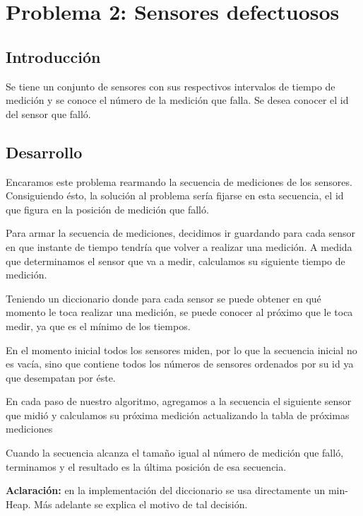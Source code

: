 \section{Problema 2: Sensores defectuosos}

\subsection{Introducci\'on}

\quad Se tiene un conjunto de sensores con sus respectivos intervalos de tiempo de medici\'on y se conoce el n\'umero de la medici\'on que falla. Se desea conocer el id del sensor que fall\'o. 

\subsection{Desarrollo}

\quad Encaramos este problema rearmando la secuencia de mediciones de los sensores. Consiguiendo \'esto, la soluci\'on al problema ser\'ia fijarse en esta secuencia, el id que figura en la posici\'on de medici\'on que fall\'o.


\quad Para armar la secuencia de mediciones, decidimos ir guardando para cada sensor en que instante de tiempo tendr\'ia que volver a realizar una medici\'on. A medida que determinamos el sensor que va a medir, calculamos su siguiente tiempo de medici\'on.


\quad Teniendo un diccionario donde para cada sensor se puede obtener en qu\'e momento le toca realizar una medici\'on, se puede conocer al pr\'oximo que le toca medir, ya que es el m\'inimo de los tiempos.


\quad En el momento inicial todos los sensores miden, por lo que la secuencia inicial no es vac\'ia, sino que contiene todos los n\'umeros de sensores ordenados por su id ya que desempatan por \'este.


\quad En cada paso de nuestro algoritmo, agregamos a la secuencia el siguiente sensor que midi\'o y calculamos su pr\'oxima medici\'on actualizando la tabla de pr\'oximas mediciones


\quad Cuando la secuencia alcanza el tama\~no igual al n\'umero de medici\'on que fall\'o, terminamos y el resultado es la \'ultima posici\'on de esa secuencia.

\quad

\textbf{Aclaraci\'on:} en la implementaci\'on del diccionario se usa directamente un min-Heap. M\'as adelante se explica el motivo de tal decisi\'on.




